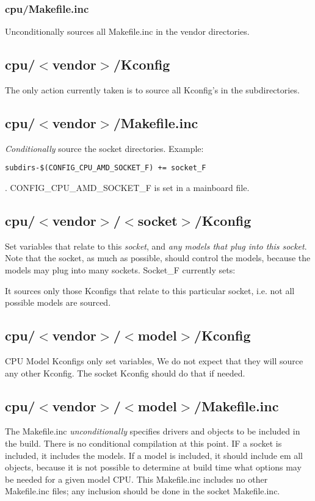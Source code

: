 \documentclass[10pt,letterpaper]{article}
\begin{document}
\subsubsection{ cpu/Makefile.inc}
Unconditionally sources all Makefile.inc in the vendor directories.

\subsection{cpu/$<$vendor$>$/Kconfig}
The only action currently taken is to source all Kconfig's in the
subdirectories.
\subsection{cpu/$<$vendor$>$/Makefile.inc}
{\em Conditionally} source the socket directories.
Example:
\begin{verbatim}
subdirs-$(CONFIG_CPU_AMD_SOCKET_F) += socket_F
\end{verbatim}
.
CONFIG\_CPU\_AMD\_SOCKET\_F is set in a mainboard file.

\subsection{cpu/$<$vendor$>$/$<$socket$>$/Kconfig}
Set variables that relate to this {\em socket}, and {\em any models that plug into this socket}. Note that
the socket, as much as possible, should control the models, because the models may plug into many sockets.
Socket\_F currently sets:


It sources only those Kconfigs that relate to this particular socket, i.e. not all possible models are sourced.

\subsection{cpu/$<$vendor$>$/$<$model$>$/Kconfig}
CPU Model Kconfigs only set variables, We do not expect that they will source any other Kconfig. The socket Kconfig should do that
if needed.
\subsection{cpu/$<$vendor$>$/$<$model$>$/Makefile.inc}
The Makefile.inc {\em unconditionally} specifies drivers and objects to be included in the build. There is no conditional
compilation at this point. IF a socket is included, it includes the models. If a model is included, it should include {em all}
objects, because it is not possible to determine at build time what options may be needed for a given model CPU.
This Makefile.inc includes no other Makefile.inc files; any inclusion should be done in the socket Makefile.inc.
\end{document}
